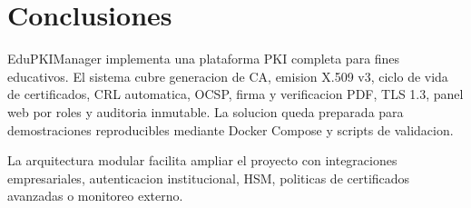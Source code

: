 \documentclass[12pt,a4paper]{article}
\begin{document}
\section{Conclusiones}

EduPKIManager implementa una plataforma PKI completa para fines educativos. El sistema cubre generacion de CA, emision X.509 v3, ciclo de vida de certificados, CRL automatica, OCSP, firma y verificacion PDF, TLS 1.3, panel web por roles y auditoria inmutable. La solucion queda preparada para demostraciones reproducibles mediante Docker Compose y scripts de validacion.

La arquitectura modular facilita ampliar el proyecto con integraciones empresariales, autenticacion institucional, HSM, politicas de certificados avanzadas o monitoreo externo.
\end{document}
